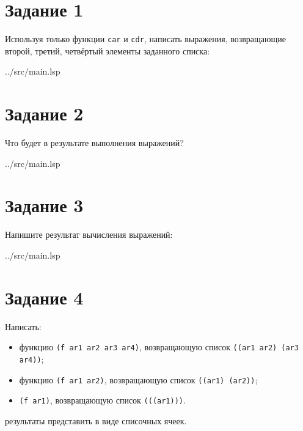 \section*{Задание 1}

Используя только функции {\texttt{car}} и {\texttt{cdr}}, написать выражения, возвращающие второй, третий, четвёртый элементы заданного списка:

\begin{lstinputlisting}[
	caption={Задание 1},
	label={lst:t1},
	style={lsp},
	linerange={3-7},
	]{../src/main.lsp}
\end{lstinputlisting}

\section*{Задание 2}

Что будет в результате выполнения выражений?

\begin{lstinputlisting}[
	caption={Задание 2},
	label={lst:t2},
	style={lsp},
	linerange={11-14},
	]{../src/main.lsp}
\end{lstinputlisting}

\section*{Задание 3}

Напишите результат вычисления выражений:

\begin{lstinputlisting}[
	caption={Задание 3},
	label={lst:t3},
	style={lsp},
	linerange={16-31},
	]{../src/main.lsp}
\end{lstinputlisting}

\section*{Задание 4}

Написать:
\begin{itemize}
	\item функцию {\texttt{(f ar1 ar2 ar3 ar4)}}, возвращающую список {\texttt{((ar1 ar2) (ar3 ar4))}};
	\item функцию {\texttt{(f ar1 ar2)}}, возвращающую список {\texttt{((ar1) (ar2))}};
	\item {\texttt{(f ar1)}}, возвращающую список {\texttt{(((ar1)))}}.
\end{itemize}

результаты представить в виде списочных ячеек.

